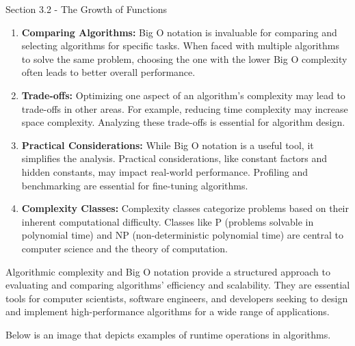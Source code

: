 \begin{notes}{Section 3.2 - The Growth of Functions}
\begin{enumerate}
        \item \textbf{Comparing Algorithms:} Big O notation is invaluable for comparing and selecting algorithms for specific tasks. When faced with multiple algorithms to solve the same problem, 
        choosing the one with the lower Big O complexity often leads to better overall performance.
    
        \item \textbf{Trade-offs:} Optimizing one aspect of an algorithm's complexity may lead to trade-offs in other areas. For example, reducing time complexity may increase space complexity. 
        Analyzing these trade-offs is essential for algorithm design.
    
        \item \textbf{Practical Considerations:} While Big O notation is a useful tool, it simplifies the analysis. Practical considerations, like constant factors and hidden constants, may impact 
        real-world performance. Profiling and benchmarking are essential for fine-tuning algorithms.
    
        \item \textbf{Complexity Classes:} Complexity classes categorize problems based on their inherent computational difficulty. Classes like P (problems solvable in polynomial time) and NP 
        (non-deterministic polynomial time) are central to computer science and the theory of computation.
    
    \end{enumerate}
    
    Algorithmic complexity and Big O notation provide a structured approach to evaluating and comparing algorithms' efficiency and scalability. They are essential tools for computer scientists, 
    software engineers, and developers seeking to design and implement high-performance algorithms for a wide range of applications.

    \begin{Highlight}
        Below is an image that depicts examples of runtime operations in algorithms.

        \begin{center}
        \end{center}


\end{Highlight}
\end{notes}

